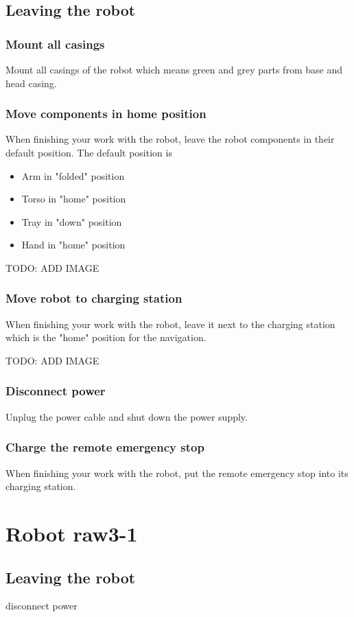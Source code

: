 \subsection{Leaving the robot}

\subsubsection{Mount all casings}
Mount all casings of the robot which means green and grey parts from base and head casing.

\subsubsection{Move components in home position}
When finishing your work with the robot, leave the robot components in their default position. The default position is
\begin{itemize}
\item Arm in "folded" position
\item Torso in "home" position
\item Tray in "down" position
\item Hand in "home" position
\end{itemize}

TODO: ADD IMAGE

\subsubsection{Move robot to charging station}
When finishing your work with the robot, leave it next to the charging station which is the "home" position for the navigation.

TODO: ADD IMAGE

\subsubsection{Disconnect power}
Unplug the power cable and shut down the power supply.

\subsubsection{Charge the remote emergency stop}
When finishing your work with the robot, put the remote emergency stop into its charging station.

\section{Robot raw3-1}

\subsection{Leaving the robot}

disconnect power